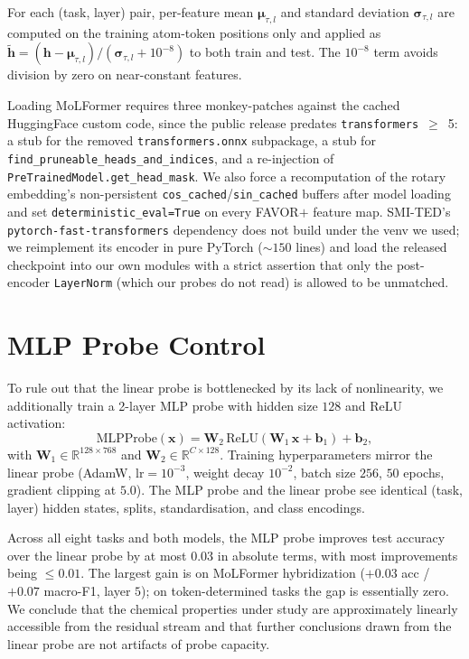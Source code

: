  For each (task, layer) pair, per-feature mean $\boldsymbol{\mu}_{\tau, l}$ and standard deviation $\boldsymbol{\sigma}_{\tau, l}$ are computed on the training atom-token positions only and applied as $\tilde{\mathbf{h}} = (\mathbf{h} - \boldsymbol{\mu}_{\tau, l}) / (\boldsymbol{\sigma}_{\tau, l} + 10^{-8})$ to both train and test. The $10^{-8}$ term avoids division by zero on near-constant features.

 Loading MoLFormer requires three monkey-patches against the cached HuggingFace custom code, since the public release predates \texttt{transformers}~$\geq$~5: a stub for the removed \texttt{transformers.onnx} subpackage, a stub for \texttt{find\_pruneable\_heads\_and\_indices}, and a re-injection of \texttt{PreTrainedModel.get\_head\_mask}. We also force a recomputation of the rotary embedding's non-persistent \texttt{cos\_cached}/\texttt{sin\_cached} buffers after model loading and set \texttt{deterministic\_eval=True} on every FAVOR$+$ feature map. SMI-TED's \texttt{pytorch-fast-transformers} dependency does not build under the venv we used; we reimplement its encoder in pure PyTorch ($\sim 150$ lines) and load the released checkpoint into our own modules with a strict assertion that only the post-encoder \texttt{LayerNorm} (which our probes do not read) is allowed to be unmatched.

\section{MLP Probe Control}
\label{app:mlp}

To rule out that the linear probe is bottlenecked by its lack of nonlinearity, we additionally train a 2-layer MLP probe with hidden size $128$ and ReLU activation:
\[
\mathrm{MLPProbe}(\mathbf{x}) = \mathbf{W}_2\,\mathrm{ReLU}(\mathbf{W}_1\,\mathbf{x} + \mathbf{b}_1) + \mathbf{b}_2,
\]
with $\mathbf{W}_1 \in \mathbb{R}^{128 \times 768}$ and $\mathbf{W}_2 \in \mathbb{R}^{C \times 128}$. Training hyperparameters mirror the linear probe (AdamW, $\mathrm{lr}{=}10^{-3}$, weight decay $10^{-2}$, batch size $256$, $50$ epochs, gradient clipping at $5.0$). The MLP probe and the linear probe see identical (task, layer) hidden states, splits, standardisation, and class encodings.

Across all eight tasks and both models, the MLP probe improves test accuracy over the linear probe by at most $0.03$ in absolute terms, with most improvements being $\leq 0.01$. The largest gain is on MoLFormer hybridization ($+0.03$ acc / $+0.07$ macro-F1, layer $5$); on token-determined tasks the gap is essentially zero. We conclude that the chemical properties under study are approximately linearly accessible from the residual stream and that further conclusions drawn from the linear probe are not artifacts of probe capacity.

